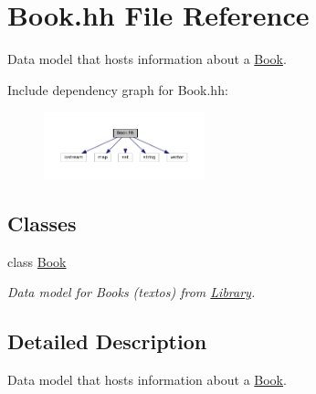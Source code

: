 \hypertarget{_book_8hh}{}\section{Book.\+hh File Reference}
\label{_book_8hh}


Data model that hosts information about a \hyperlink{class_book}{Book}.  


Include dependency graph for Book.\+hh\+:
\nopagebreak
\begin{figure}[H]
\begin{center}
\leavevmode
\includegraphics[width=132pt]{_book_8hh__incl}
\end{center}
\end{figure}
\subsection*{Classes}
\begin{DoxyCompactItemize}
\item 
class \hyperlink{class_book}{Book}
\begin{DoxyCompactList}\small\item\em Data model for Books (textos) from \hyperlink{class_library}{Library}. \end{DoxyCompactList}\end{DoxyCompactItemize}


\subsection{Detailed Description}
Data model that hosts information about a \hyperlink{class_book}{Book}. 

